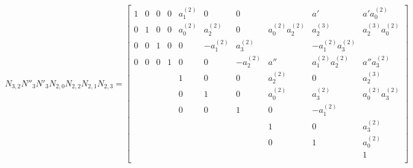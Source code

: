 \documentclass{article}
\begin{document}
\[
N_{3,2}N''_3N'_3N_{2,0}N_{2,2}N_{2,1}N_{2,3}=
  \begin{bmatrix}
    1 & 0 & 0 & 0 & a_1^{(2)} & 0 & 0 &  & a' & a'a_0^{(2)} \\
    0 & 1 & 0 & 0 & a_0^{(2)} & a_2^{(2)} & 0 & a_0^{(2)}a_2^{(2)} & a_2^{(3)} & a_2^{(3)}a_0^{(2)} \\
    0 & 0 & 1 & 0 & 0 & -a_1^{(2)} & a_3^{(2)} &  & -a_1^{(2)}a_3^{(2)} &  \\
    0 & 0 & 0 & 1 & 0 & 0 & -a_2^{(2)} & a'' & a_1^{(2)}a_2^{(2)} & a''a_3^{(2)} \\
    & & & & 1 & 0 & 0 & a_2^{(2)} & 0 & a_2^{(3)} \\
    & & & & 0 & 1 & 0 & a_0^{(2)} & a_3^{(2)} & a_0^{(2)}a_3^{(2)}\\
    & & & & 0 & 0 & 1 & 0 & -a_1^{(2)} &  \\
    & & & & & & & 1 & 0 & a_3^{(2)} \\
    & & & & & & & 0 & 1 & a_0^{(2)} \\
    & & & & & & & & & 1 \\
  \end{bmatrix}
\]
\end{document}
